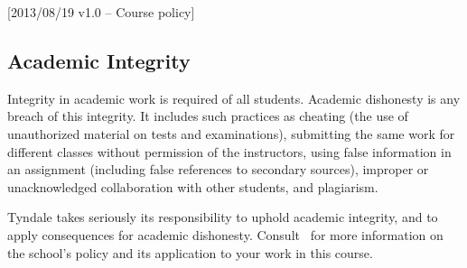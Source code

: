[2013/08/19 v1.0 -- Course policy]

\subsection{Academic Integrity}
\label{integrity}

Integrity in academic work is required of all students. Academic dishonesty
is any breach of this integrity. It includes such practices as cheating (the
use of unauthorized material on tests and examinations), submitting the same
work for different classes without permission of the instructors, using false
information in an assignment (including false references to secondary sources),
improper or unacknowledged collaboration with other students, and plagiarism.

Tyndale takes seriously its responsibility to uphold academic integrity,
and to apply consequences for academic dishonesty. Consult \SecAC\ for more
information on the school's policy and its application to your work in this
course.
